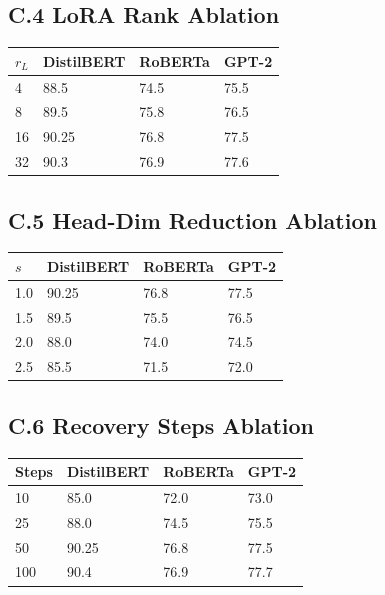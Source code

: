 \subsection{C.4 LoRA Rank Ablation}

\begin{table}[H]
\centering
\small
\begin{tabular}{llll}
\toprule
\textbf{$r_L$} & \textbf{DistilBERT} & \textbf{RoBERTa} & \textbf{GPT-2} \\
\midrule
4 & 88.5 & 74.5 & 75.5 \\
8 & 89.5 & 75.8 & 76.5 \\
16 & 90.25 & 76.8 & 77.5 \\
32 & 90.3 & 76.9 & 77.6 \\
\bottomrule
\end{tabular}
\end{table}

\subsection{C.5 Head-Dim Reduction Ablation}

\begin{table}[H]
\centering
\small
\begin{tabular}{llll}
\toprule
\textbf{$s$} & \textbf{DistilBERT} & \textbf{RoBERTa} & \textbf{GPT-2} \\
\midrule
1.0 & 90.25 & 76.8 & 77.5 \\
1.5 & 89.5 & 75.5 & 76.5 \\
2.0 & 88.0 & 74.0 & 74.5 \\
2.5 & 85.5 & 71.5 & 72.0 \\
\bottomrule
\end{tabular}
\end{table}

\subsection{C.6 Recovery Steps Ablation}

\begin{table}[H]
\centering
\small
\begin{tabular}{llll}
\toprule
\textbf{Steps} & \textbf{DistilBERT} & \textbf{RoBERTa} & \textbf{GPT-2} \\
\midrule
10 & 85.0 & 72.0 & 73.0 \\
25 & 88.0 & 74.5 & 75.5 \\
50 & 90.25 & 76.8 & 77.5 \\
100 & 90.4 & 76.9 & 77.7 \\
\bottomrule
\end{tabular}
\end{table}

